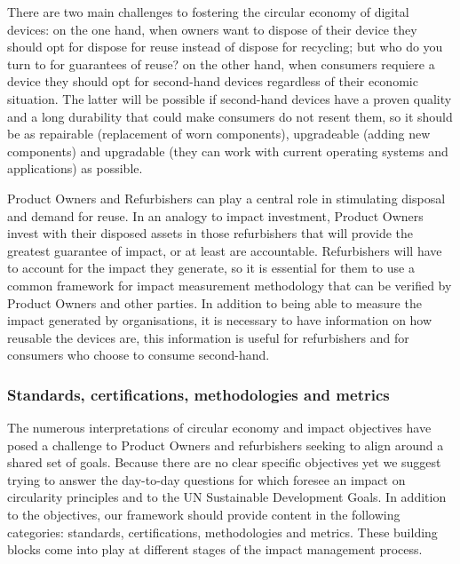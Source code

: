 \documentclass[
]{book}
\begin{document}
There are two main challenges to fostering the circular economy of digital devices: on the one hand, when owners want to dispose of their device they should opt for dispose for reuse instead of dispose for recycling; but who do you turn to for guarantees of reuse? on the other hand, when consumers requiere a device they should opt for second-hand devices regardless of their economic situation. The latter will be possible if second-hand devices have a proven quality and a long durability that could make consumers do not resent them, so it should be as repairable (replacement of worn components), upgradeable (adding new components) and upgradable (they can work with current operating systems and applications) as possible.

Product Owners and Refurbishers can play a central role in stimulating disposal and demand for reuse. In an analogy to impact investment, Product Owners invest with their disposed assets in those refurbishers that will provide the greatest guarantee of impact, or at least are accountable. Refurbishers will have to account for the impact they generate, so it is essential for them to use a common framework for impact measurement methodology that can be verified by Product Owners and other parties. In addition to being able to measure the impact generated by organisations, it is necessary to have information on how reusable the devices are, this information is useful for refurbishers and for consumers who choose to consume second-hand.

\hypertarget{standards-certifications-methodologies-and-metrics}{%
\subsubsection{Standards, certifications, methodologies and metrics}\label{standards-certifications-methodologies-and-metrics}}

The numerous interpretations of circular economy and impact objectives have posed a challenge to Product Owners and refurbishers seeking to align around a shared set of goals. Because there are no clear specific objectives yet we suggest trying to answer the day-to-day questions for which foresee an impact on circularity principles and to the UN Sustainable Development Goals. In addition to the objectives, our framework should provide content in the following categories: standards, certifications, methodologies and metrics. These building blocks come into play at different stages of the impact management process.
\end{document}
